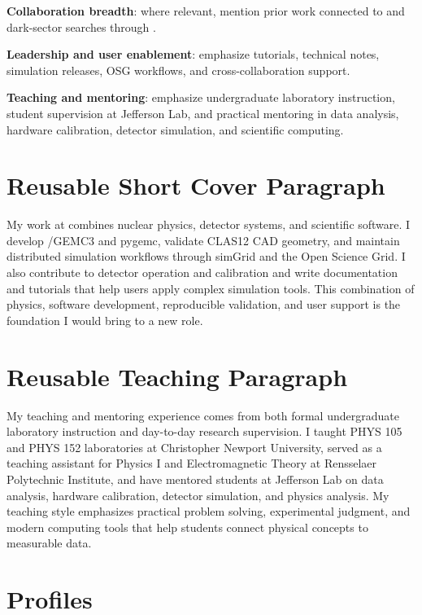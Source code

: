 \documentclass[11pt,letterpaper]{article}
\begin{document}
\textbf{Collaboration breadth}: where relevant, mention prior work connected to
\MauriSPringEight{} and dark-sector searches through \MauriHPS{}.

\textbf{Leadership and user enablement}: emphasize tutorials, technical notes,
simulation releases, OSG workflows, and cross-collaboration support.

\textbf{Teaching and mentoring}: emphasize undergraduate laboratory instruction,
student supervision at Jefferson Lab, and practical mentoring in data analysis,
hardware calibration, detector simulation, and scientific computing.

\begin{minipage}{\textwidth}
\section*{Reusable Short Cover Paragraph}
My work at \MauriJLab{} combines nuclear physics, detector systems, and scientific
software. I develop \MauriGEMC{}/GEMC3 and pygemc, validate CLAS12 CAD geometry,
and maintain distributed simulation workflows through simGrid and the Open
Science Grid. I also contribute to detector operation and calibration and write
documentation and tutorials that help users apply complex simulation tools.
This combination of physics, software development, reproducible validation,
and user support is the foundation I would bring to a new role.
\end{minipage}

\section*{Reusable Teaching Paragraph}
My teaching and mentoring experience comes from both formal undergraduate
laboratory instruction and day-to-day research supervision. I taught PHYS 105
and PHYS 152 laboratories at Christopher Newport University, served as a teaching
assistant for Physics I and Electromagnetic Theory at Rensselaer Polytechnic
Institute, and have mentored students at Jefferson Lab on data analysis,
hardware calibration, detector simulation, and physics analysis. My teaching
style emphasizes practical problem solving, experimental judgment, and modern
computing tools that help students connect physical concepts to measurable data.

\section*{Profiles}
\MauriHomepage{} \quad \MauriGitHub{} \quad \MauriScholar{} \quad \MauriInspire{} \quad \MauriOrcid{}
\end{document}
